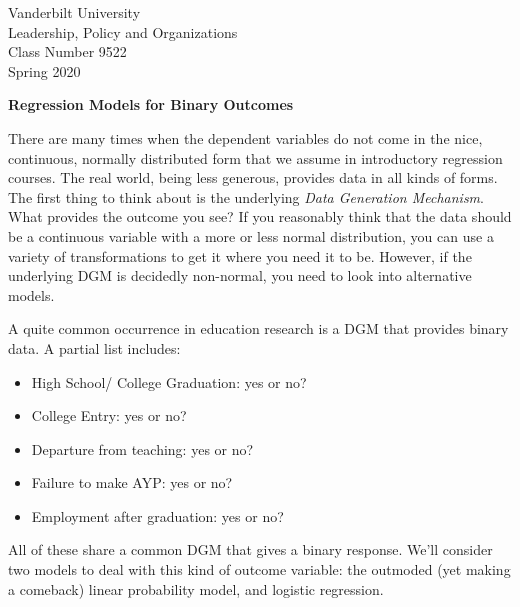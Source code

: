 \documentclass[12pt]{article}
\begin{document}
\thispagestyle{empty}%

\setlength{\parskip}{1ex plus 0.5ex minus 0.2ex}

\setcounter{secnumdepth}{-2}


\begin{flushleft}
Vanderbilt University\\Leadership, Policy and Organizations\\Class Number 9522\\ Spring 2020\\
\end{flushleft}

\begin{center}
\textbf{Regression Models for Binary Outcomes}
\end{center}


There are many times when the dependent variables do not come in the
nice, continuous, normally distributed form that we assume in
introductory regression courses. The real world, being less generous,
provides data in all kinds of forms. The first thing to think about is
the underlying \textit{Data Generation Mechanism}. What provides the
outcome you see? If you reasonably think that the data should be a
continuous variable with a more or less normal distribution, you can
use a variety of transformations to get it where you need it to
be. However, if the underlying DGM is decidedly non-normal, you need
to look into alternative models.

A quite common occurrence in education research is a DGM that provides
binary data. A partial list includes:

\begin{itemize}
\item High School/ College Graduation: yes or no?

\item College Entry: yes or no?

\item Departure from teaching: yes or no?

\item Failure to make AYP: yes or no?

\item Employment after graduation: yes or no?

\end{itemize}

All of these share a common DGM that gives a binary response. We'll
consider two models to deal with this kind of outcome variable: the
outmoded (yet making a comeback) linear probability model, and logistic regression. 
\end{document}
